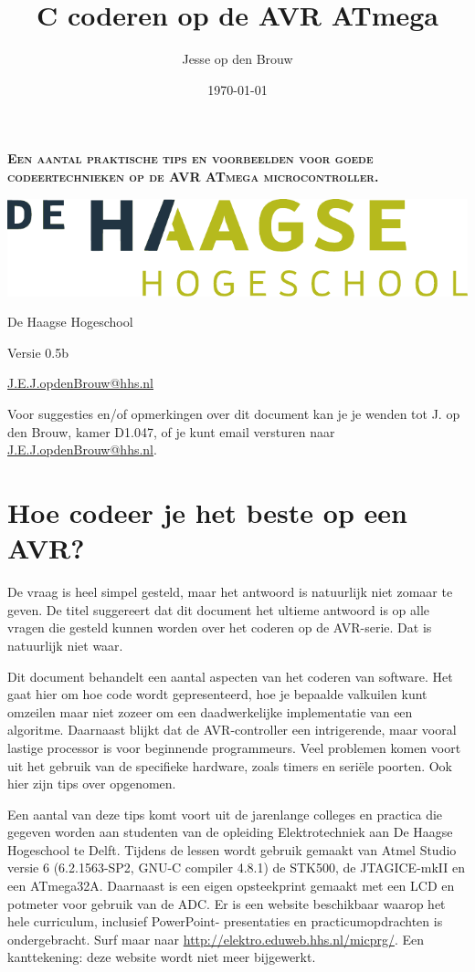 \documentclass[12pt,a4paper,final,twoside,fleqn]{article}
\author{Jesse op den Brouw}
\title{C coderen op de AVR ATmega}
\date{\today}
\makeatletter
\newcommand{\subtitle}{Een aantal praktische tips en voorbeelden voor goede codeertechnieken op de AVR ATmega microcontroller.}
\newcommand{\version}{0.5b}
\newcommand\emailaddress{\href{mailto:J.E.J.opdenBrouw@hhs.nl}{\sffamily J.E.J.opdenBrouw@hhs.nl}}
\def\maketitle{%
  \null
  \thispagestyle{empty}%
  \vfill
  \begin{center}\leavevmode
    {\fontfamily{phv}\fontsize{30pt}{36pt}\selectfont\bfseries\scshape \@title\par}%
    \vskip 1.0cm
    {\fontfamily{phv}\fontsize{13pt}{16pt}\selectfont\bfseries\scshape \subtitle\par}%
    \vskip 8.0cm
    \begin{minipage}[c]{.50\linewidth}
       \includegraphics[width=\linewidth]{HHS_grijs_groen_fc}
    \end{minipage}\hfill
    \begin{minipage}[c]{0.40\linewidth}
       {\hfill \large \@author\par}%
       \vskip 0.03cm
       {\hfill \large De Haagse Hogeschool\par}%
       \vskip 0.03cm
       {\hfill \large \@date\par}%
       \vskip 0.03cm
       {\hfill \large Versie \version\par}%
       \vskip 0.03cm
       {\hfill \large \emailaddress\par}%
  \end{minipage}
  \end{center}%
  \vfill
  \null
  }
\makeatother
\begin{document}
\raggedbottom
\maketitle

\newpage
\tableofcontents
\vfill
Voor suggesties en/of opmerkingen over dit document kan je je wenden tot
J. op den Brouw, kamer D1.047, of je kunt email versturen naar \emailaddress.


\newpage
\listoffigures
\lstlistoflistings

\setcounter{section}{-1}
\newpage
\thispagestyle{fancy}
\section{Hoe codeer je het beste op een AVR?}
De vraag is heel simpel gesteld, maar het antwoord is natuurlijk niet
zomaar te geven.
De titel suggereert dat dit document het ultieme antwoord is op
alle vragen die gesteld kunnen worden over het coderen op de AVR-serie.
Dat is natuurlijk niet waar. 

Dit document behandelt een aantal aspecten van het coderen van software.
Het gaat hier om hoe code wordt gepresenteerd, hoe je bepaalde valkuilen
kunt omzeilen maar niet zozeer om een daadwerkelijke implementatie van een
algoritme. Daarnaast blijkt dat de AVR-controller een intrigerende, maar
vooral lastige processor is voor beginnende programmeurs. Veel problemen
komen voort uit het gebruik van de specifieke hardware, zoals timers en
seri\"{e}le poorten. Ook hier zijn tips over opgenomen.

Een aantal van deze tips komt voort uit de jarenlange colleges en practica
die gegeven worden aan studenten van de opleiding Elektrotechniek aan De
Haagse Hogeschool te Delft. Tijdens de lessen wordt gebruik gemaakt van
Atmel Studio versie 6 (6.2.1563-SP2, GNU-C compiler 4.8.1)
de STK500, de JTAGICE-mkII en een ATmega32A. Daarnaast is een eigen
opsteekprint gemaakt met een LCD en potmeter voor gebruik van de ADC.
Er is een website beschikbaar waarop het hele curriculum, inclusief PowerPoint-%
presentaties en practicumopdrachten is ondergebracht. Surf maar naar
\url{http://elektro.eduweb.hhs.nl/micprg/}. Een kanttekening: deze website wordt
niet meer bijgewerkt.
\end{document}
